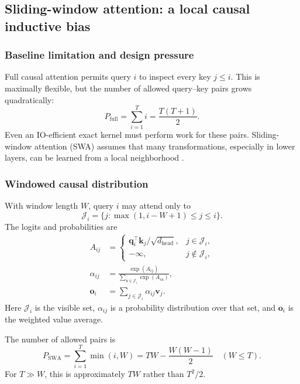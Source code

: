 \documentclass[11pt,a4paper]{article}
\theoremstyle{definition}
\theoremstyle{plain}
\newcommand{\vq}{\bm{q}}
\newcommand{\vk}{\bm{k}}
\newcommand{\vv}{\bm{v}}
\newcommand{\vo}{\bm{o}}
\newcommand{\dhead}{d_{\mathrm{head}}}
\begin{document}
\subsection{Sliding-window attention: a local causal inductive bias}
\label{sec:swa}

\subsubsection{Baseline limitation and design pressure}

Full causal attention permits query $i$ to inspect every key $j\leq i$. This is maximally flexible, but the number of allowed query--key pairs grows quadratically:
\begin{equation}
    P_{\mathrm{full}}
    =\sum_{i=1}^{T}i
    =\frac{T(T+1)}{2}.
\end{equation}
Even an IO-efficient exact kernel must perform work for these pairs. Sliding-window attention (SWA) assumes that many transformations, especially in lower layers, can be learned from a local neighborhood \cite{jiang2023mistral}.

\subsubsection{Windowed causal distribution}

With window length $W$, query $i$ may attend only to
\begin{equation}
    \mathcal{J}_i
    =\{j:\max(1,i-W+1)\leq j\leq i\}.
\end{equation}
The logits and probabilities are
\begin{align}
    A_{ij}
    &=\begin{cases}
       \vq_i^\top\vk_j/\sqrt{\dhead}, & j\in\mathcal{J}_i,\\
       -\infty, & j\notin\mathcal{J}_i,
      \end{cases}\\
    \alpha_{ij}
    &=\frac{\exp(A_{ij})}
      {\sum_{u\in\mathcal{J}_i}\exp(A_{iu})},\\
    \vo_i&=\sum_{j\in\mathcal{J}_i}\alpha_{ij}\vv_j.
\end{align}
Here $\mathcal{J}_i$ is the visible set, $\alpha_{ij}$ is a probability distribution over that set, and $\vo_i$ is the weighted value average.

The number of allowed pairs is
\begin{equation}\label{eq:swa-pairs}
    P_{\mathrm{SWA}}
    =\sum_{i=1}^{T}\min(i,W)
    =TW-\frac{W(W-1)}{2}
    \quad (W\leq T).
\end{equation}
For $T\gg W$, this is approximately $TW$ rather than $T^2/2$.
\end{document}
